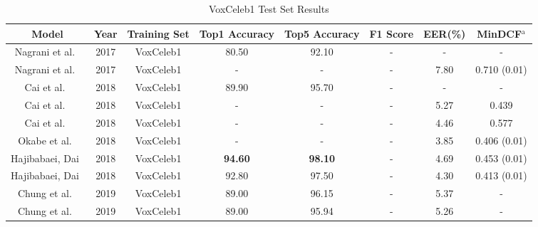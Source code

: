 \documentclass[conference]{IEEEtran}
\begin{document}
\begin{table}[htbp]
    \caption{VoxCeleb1 Test Set Results}
    \begin{center}
        \begin{tabular}{|c|c|c|c|c|c|c|c|}
        \hline
        \textbf{Model} & \textbf{Year} & \textbf{Training Set} &  \textbf{Top1 Accuracy} & \textbf{Top5 Accuracy} & \textbf{F1 Score} & \textbf{EER(\%)} & \textbf{MinDCF}$^{\mathrm{a}}$\\
        \hline
        Nagrani et al.~\cite{nagrani2017voxceleb} & 2017 & VoxCeleb1 & 80.50 & 92.10 & - & - & - \\
        Nagrani et al.~\cite{nagrani2017voxceleb} & 2017 & VoxCeleb1 & - & - & - & 7.80 & 0.710 (0.01) \\
        Cai et al.~\cite{cai2018exploring} & 2018 & VoxCeleb1 & 89.90 & 95.70 & - & - & - \\
        Cai et al.~\cite{cai2018exploring} & 2018 & VoxCeleb1 & - & - & - & 5.27 & 0.439 \\
        Cai et al.~\cite{cai2018exploring} & 2018 & VoxCeleb1 & - & - & - & 4.46 & 0.577 \\
        Okabe et al.~\cite{okabe2018asp} & 2018 & VoxCeleb1 & - & - & - & 3.85 & 0.406 (0.01) \\
        Hajibabaei, Dai~\cite{hajibabaei2018unified} & 2018 & VoxCeleb1 & \textbf{94.60} & \textbf{98.10} & - & 4.69 & 0.453 (0.01) \\
        Hajibabaei, Dai~\cite{hajibabaei2018unified} & 2018 & VoxCeleb1 & 92.80 & 97.50 & - & 4.30 & 0.413 (0.01) \\
        Chung et al.~\cite{chung2019delving} & 2019 & VoxCeleb1 & 89.00 & 96.15 & - & 5.37 & - \\
        Chung et al.~\cite{chung2019delving} & 2019 & VoxCeleb1 & 89.00 & 95.94 & - & 5.26 & - \\

\end{tabular}
\end{center}
\end{table}
\end{document}
